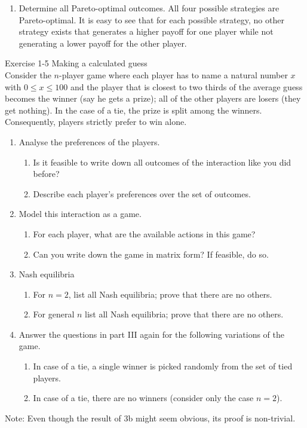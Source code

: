 \documentclass[../main.tex]{subfiles}
\begin{document}
\begin{solution}
\begin{enumerate}
	\item Determine all Pareto-optimal outcomes.
	All four possible strategies are Pareto-optimal. It is easy to see that for each possible strategy, no other strategy exists that generates a higher payoff for one player while not generating a lower payoff for the other player.
		
\end{enumerate}

\end{solution}

\begin{question}
Exercise 1-5 Making a calculated guess\\
Consider the $n$-player game where each player has to name a natural number $x$ with $ 0 \leq x \leq 100$ and the player that is closest to two thirds of the average guess becomes the winner (say he gets a prize); all of the other players are losers (they get nothing). In the case of a tie, the prize is split among the winners. Consequently, players strictly prefer to win alone.\\

\begin{enumerate}
\item Analyse the preferences of the players.
	\begin{enumerate}
	\item Is it feasible to write down all outcomes of the interaction like you did before?
	\item Describe each player’s preferences over the set of outcomes.
	\end{enumerate}
\item Model this interaction as a game.
	\begin{enumerate}
	\item For each player, what are the available actions in this game?
	\item Can you write down the game in matrix form? If feasible, do so.
	\end{enumerate}
\item Nash equilibria
	\begin{enumerate}
	\item For $n = 2$, list all Nash equilibria; prove that there are no others.
	\item For general $n$ list all Nash equilibria; prove that there are no others.
	\end{enumerate}	
\item Answer the questions in part III again for the following variations of the game.
	\begin{enumerate}
	\item In case of a tie, a single winner is picked randomly from the set of tied players.
	\item In case of a tie, there are no winners (consider only the case $n=2$).
	\end{enumerate}	
\end{enumerate}
Note: Even though the result of 3b might seem obvious, its proof is non-trivial.
\end{question}
\end{document}
